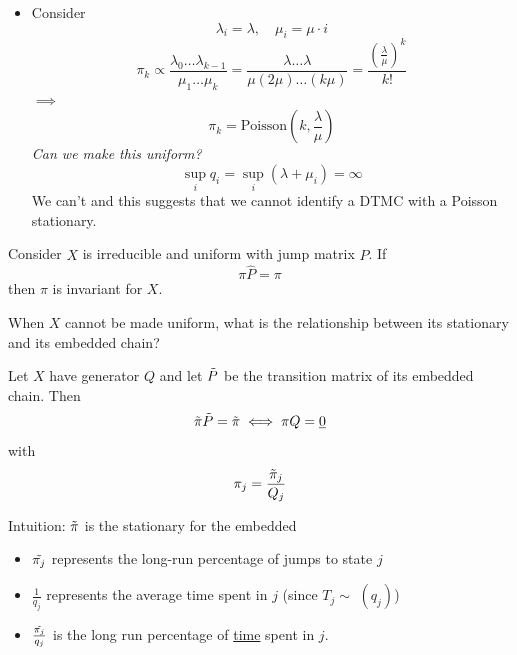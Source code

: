 \documentclass{article}
\begin{document}
\begin{example}
\begin{itemize}
\begin{itemize}
\begin{align*}
				&=  \pi_0 (1-\rho)^{-1}
			\end{align*}
			$\implies$ 
			\begin{equation*}
				\pi_k = (1-\rho) \rho^k 
			\end{equation*}
			(compare DTMC)
			\item Consider
			\begin{equation*}
				\lambda_i = \lambda, \quad \mu_i = \mu \cdot i
			\end{equation*}
			\begin{equation*}
				\pi_k \propto  \frac{\lambda_0 \ldots \lambda_{k-1}}{\mu_1 \ldots \mu_k} =  \frac{\lambda \ldots \lambda}{\mu (2 \mu) \ldots (k \mu)} = \frac{(\frac{\lambda}{\mu})^k}{k!}
			\end{equation*}
			$\implies$
			\begin{equation*}
				\pi_k =  \text{Poisson}(k, \frac{\lambda}{\mu})
			\end{equation*}
			\textit{Can we make this uniform?}
			\begin{equation*}
				\sup_i q_i = \sup_i (\lambda + \mu_i) = \infty
			\end{equation*}
			We can't and this suggests that we cannot identify a DTMC with a Poisson stationary.
		\end{itemize}
	\end{itemize}
\end{example}
\begin{proposition}
	Consider $X$ is irreducible and uniform with jump matrix $\hat{P}$. If 
	\begin{equation*}
		\pi \hat{P} = \pi
	\end{equation*}
	then $\pi$ is invariant for $X$.
\end{proposition}
When $X$ cannot be made uniform, what is the relationship between its stationary and its embedded chain?
\begin{proposition}
	Let $X$ have generator $Q$ and let $\Tilde{P}$ be the transition matrix of its embedded chain. Then
	\begin{equation*}
		\Tilde{\pi}\Tilde{P} = \Tilde{\pi} \iff \pi Q = \underline{0}
	\end{equation*}
	with 
	\begin{equation*}
		\pi_j = \frac{\Tilde{\pi}_j}{Q_j} 
	\end{equation*}
\end{proposition}
Intuition: $\Tilde{\pi}$ is the stationary for the embedded 
\begin{itemize}
	\item $\Tilde{\pi_j}$ represents the long-run percentage of jumps to state $j$
	\item $\frac{1}{q_j}$ represents the average time spent in $j$ (since $T_j \sim$  $(q_j)$)
	\item $\frac{\Tilde{\pi_j}}{q_j}$ is the long run percentage of \underline{time} spent in $j$. 
\end{itemize} 
\end{document}

